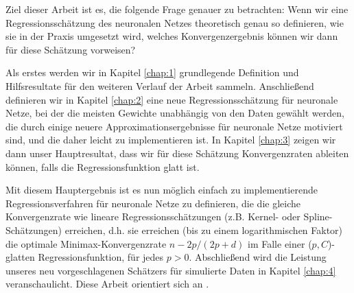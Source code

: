 Ziel dieser Arbeit ist es, die folgende Frage genauer zu betrachten: Wenn wir eine Regressionsschätzung des neuronalen Netzes theoretisch genau so definieren, wie sie in der Praxis umgesetzt wird, welches Konvergenzergebnis können wir dann für diese Schätzung vorweisen? 

Als erstes werden wir in Kapitel \ref{chap:1} grundlegende Definition und Hilfsresultate für den weiteren Verlauf der Arbeit sammeln.
Anschließend definieren wir in Kapitel \ref{chap:2} eine neue Regressionsschätzung für neuronale Netze, bei der die meisten Gewichte unabhängig von den Daten gewählt werden, die durch einige neuere Approximationsergebnisse für neuronale Netze motiviert sind, und die daher leicht zu implementieren ist. In Kapitel \ref{chap:3} zeigen wir dann unser Hauptresultat, dass wir für diese Schätzung Konvergenzraten ableiten können, falls die Regressionsfunktion glatt ist. 

Mit diesem Hauptergebnis ist es nun möglich einfach zu implementierende Regressionsverfahren für neuronale Netze zu definieren, die die gleiche Konvergenzrate wie lineare Regressionsschätzungen (z.B. Kernel- oder Spline-Schätzungen) erreichen, d.h. sie erreichen (bis zu einem logarithmischen Faktor) die optimale Minimax-Konvergenzrate $n-2p/(2p+d)$ im Falle einer ($p,C$)-glatten Regressionsfunktion, für jedes $p > 0$.
Abschließend wird die Leistung unseres neu vorgeschlagenen Schätzers für simulierte Daten in Kapitel \ref{chap:4} veranschaulicht. Diese Arbeit orientiert sich an \cite{kohler19}.

